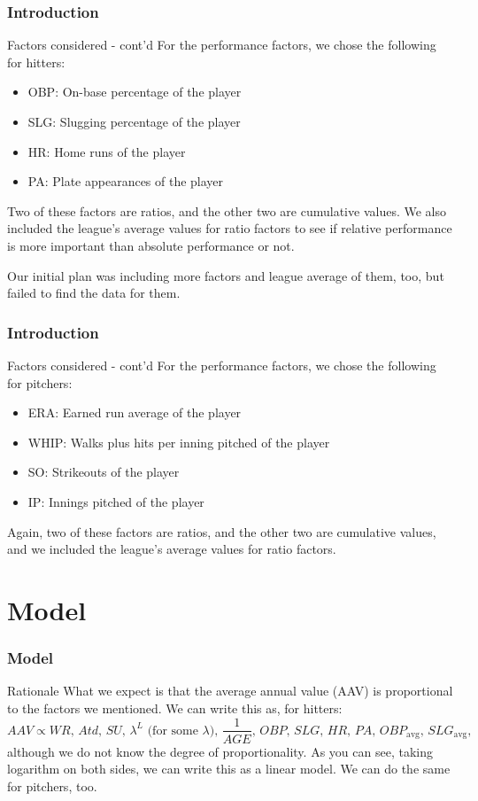 \documentclass[9pt]{beamer}
\begin{document}
\begin{frame}
    \frametitle{Introduction}
    \begin{block}{Factors considered - cont'd}
        For the performance factors, we chose the following for hitters:
        \begin{itemize}
            \item OBP: On-base percentage of the player
            \item SLG: Slugging percentage of the player
            \item HR: Home runs of the player
            \item PA: Plate appearances of the player
        \end{itemize}
        Two of these factors are ratios, and the other two are cumulative values. We also included the league's average values for ratio factors to see if relative performance is more important than absolute performance or not.
    \end{block}
    Our initial plan was including more factors and league average of them, too, but failed to find the data for them.
\end{frame}
\begin{frame}
    \frametitle{Introduction}
    \begin{block}{Factors considered - cont'd}
        For the performance factors, we chose the following for pitchers:
        \begin{itemize}
            \item ERA: Earned run average of the player
            \item WHIP: Walks plus hits per inning pitched of the player
            \item SO: Strikeouts of the player
            \item IP: Innings pitched of the player
        \end{itemize}
        Again, two of these factors are ratios, and the other two are cumulative values, and we included the league's average values for ratio factors.
    \end{block}
\end{frame}

\section{Model}

\begin{frame}
    \frametitle{Model}
    \begin{block}{Rationale}
        What we expect is that the average annual value (AAV) is proportional to the factors we mentioned. We can write this as, for hitters:
        \[
            AAV \propto WR, \, Atd, \, SU, \, \lambda^L \text{ (for some } \lambda), \, \frac{1}{AGE}, \, OBP, \, SLG, \, HR, \, PA, \, OBP_{\text{avg}}, \, SLG_{\text{avg}},
        \]
        although we do not know the degree of proportionality. As you can see, taking logarithm on both sides, we can write this as a linear model. We can do the same for pitchers, too.
    \end{block}
\end{frame}
\end{document}

